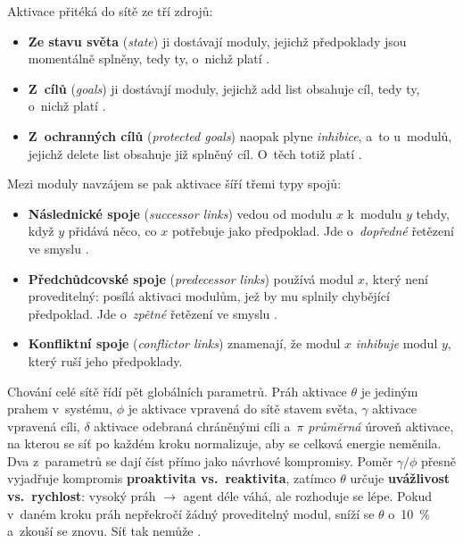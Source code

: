 \documentclass[11pt,a4paper]{article}
\theoremstyle{definition}
\begin{document}
Aktivace přitéká do sítě ze tří zdrojů:
\begin{itemize}
\item \textbf{Ze stavu světa} (\emph{state}) ji dostávají moduly, jejichž předpoklady jsou
  momentálně splněny, tedy ty, o~nichž platí .
\item \textbf{Z~cílů} (\emph{goals}) ji dostávají moduly, jejichž add list obsahuje cíl, tedy
  ty, o~nichž platí .
\item \textbf{Z~ochranných cílů} (\emph{protected goals}) naopak plyne \emph{inhibice}, a~to
  u~modulů, jejichž delete list obsahuje již splněný cíl. O~těch totiž platí .
\end{itemize}
Mezi moduly navzájem se pak aktivace šíří třemi typy spojů:
\begin{itemize}
\item \textbf{Následnické spoje} (\emph{successor links}) vedou od modulu $x$ k~modulu $y$
  tehdy, když $y$ přidává něco, co $x$ potřebuje jako předpoklad. Jde o~\emph{dopředné}
  řetězení ve smyslu .
\item \textbf{Předchůdcovské spoje} (\emph{predecessor links}) používá modul $x$, který není
  proveditelný: posílá aktivaci modulům, jež by mu splnily chybějící předpoklad. Jde
  o~\emph{zpětné} řetězení ve smyslu .
\item \textbf{Konfliktní spoje} (\emph{conflictor links}) znamenají, že modul $x$
  \emph{inhibuje} modul $y$, který ruší jeho předpoklady.
\end{itemize}
Chování celé sítě řídí pět globálních parametrů. Práh aktivace $\theta$ je jediným prahem
v~systému, $\phi$ je aktivace vpravená do sítě stavem světa, $\gamma$ aktivace vpravená cíli,
$\delta$ aktivace odebraná chráněnými cíli a~$\pi$ \emph{průměrná} úroveň aktivace, na kterou
se síť po každém kroku normalizuje, aby se celková energie neměnila. Dva z~parametrů se dají
číst přímo jako návrhové kompromisy. Poměr $\gamma/\phi$ přesně vyjadřuje kompromis
\textbf{proaktivita vs.\ reaktivita}, zatímco $\theta$ určuje \textbf{uvážlivost vs.\ rychlost}:
vysoký práh $\to$ agent déle váhá, ale rozhoduje se lépe. Pokud v~daném kroku práh nepřekročí
žádný proveditelný modul, sníží se $\theta$ o~10~\% a~zkouší se znovu. Síť tak nemůže
.
\end{document}
